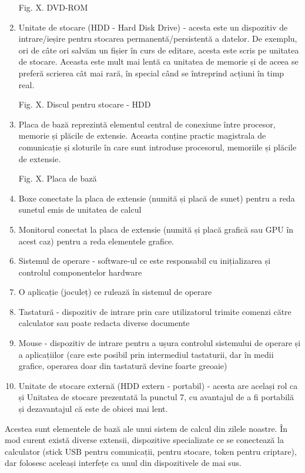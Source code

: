 \begin{enumerate}
Fig. X. DVD-ROM

	\item Unitate de stocare (HDD  - Hard Disk
		Drive) - acesta este un dispozitiv de intrare/ieșire pentru
		stocarea permanentă/persistentă a datelor. De exemplu, ori de
		câte ori salvăm un fișier în curs de editare, acesta este scris
		pe unitatea de stocare. Aceasta este mult mai lentă ca unitatea
		de memorie și de aceea se preferă scrierea cât mai rară, în
		special când se întreprind acțiuni în timp real.

Fig. X. Discul pentru stocare - HDD

	\item Placa de bază reprezintă elementul central de conexiune între
		procesor, memorie și plăcile de extensie. Aceasta conține
		practic magistrala de comunicație și sloturile în care sunt
		introduse procesorul, memoriile și plăcile de extensie.

Fig. X. Placa de bază

	\item Boxe conectate la placa de extensie (numită și placă de sunet)
		pentru a reda sunetul emis de unitatea de calcul
	\item Monitorul conectat la placa de extensie (numită și placă grafică
		sau GPU  în acest caz)
		pentru a reda elementele grafice.
	\item Sistemul de operare - software-ul ce este responsabil cu
		inițializarea și controlul componentelor hardware
	\item O aplicație (joculeț) ce rulează în sistemul de operare
	\item Tastatură - dispozitiv de intrare prin care utilizatorul trimite
		comenzi către calculator sau poate redacta diverse documente
	\item Mouse - dispozitiv de intrare pentru a ușura controlul sistemului
		de operare și a aplicațiilor (care este posibil prin intermediul
		tastaturii, dar în medii grafice, operarea doar din tastatură
		devine foarte greoaie)
	\item Unitate de stocare externă (HDD extern - portabil) - acesta are
		același rol ca și Unitatea de stocare prezentată la punctul 7,
		cu avantajul de a fi portabilă și dezavantajul că este de obicei
		mai lent.

\end{enumerate}

Acestea sunt elementele de bază ale unui sistem de calcul din zilele noastre. În
mod curent există diverse extensii, dispozitive specializate ce se conectează la
calculator (stick USB pentru comunicații, pentru stocare, token pentru
criptare), dar folosesc aceleași interfețe ca unul din dispozitivele de mai sus.

